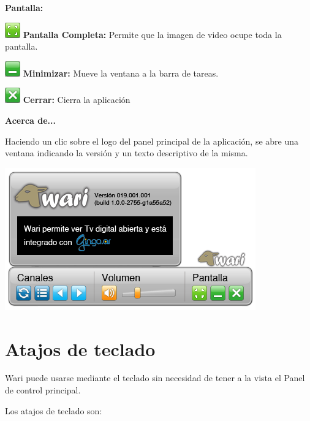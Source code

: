 \documentclass{article}
\begin{document}
\vspace{0.5cm}
\textbf{Pantalla:}

\vspace{0.5cm}
\includegraphics[scale=0.75,keepaspectratio=true]{BtnPantallaCompleta} \textbf{Pantalla Completa:} Permite que la imagen de video ocupe toda la pantalla.

\includegraphics[scale=0.75,keepaspectratio=true]{BtnPantallaMinimizar} \textbf{Minimizar:} Mueve 			la ventana a la barra de tareas.

\includegraphics[scale=0.75,keepaspectratio=true]{BtnPantallaCerrar} \textbf{Cerrar:} Cierra la 			aplicación

\vspace{0.5cm}
\textbf{Acerca de...}

Haciendo un clic sobre el logo del panel principal de la aplicación, se abre una ventana 			indicando la versión y un texto descriptivo de la misma.

\vspace{0.5cm}
\centerline{\includegraphics[scale=0.75,keepaspectratio=true]{About}}

\vspace{0.5cm}
\section{Atajos de teclado}
Wari puede usarse mediante el teclado sin necesidad de tener a la vista el Panel de control principal.

Los atajos de teclado son:
\end{document}
